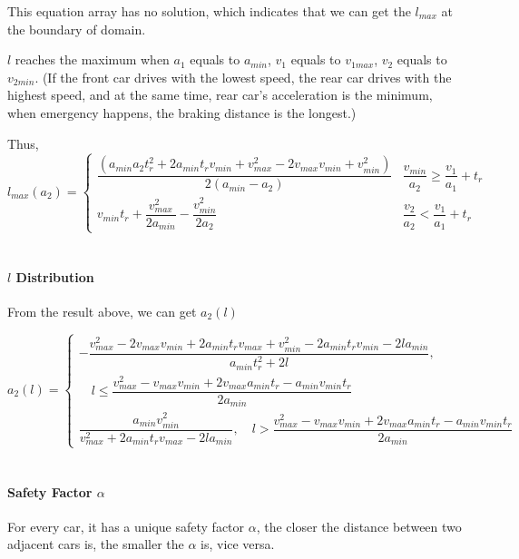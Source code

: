 This equation array has no solution, which indicates that we can 
get the $l_{max}$ at the boundary of domain.

$l$ reaches the maximum when $a_1$ equals to $a_{min}$, { }$v_1$ 
equals to $v_{1max}$, $v_2$ equals to $v_{2min}$. (If the front 
car drives with the lowest speed, the rear car drives with the 
highest speed, and at the same time, rear car's acceleration is 
the minimum, when emergency happens, the braking distance is 
the longest.)

Thus,
\begin{displaymath}
l_{max}(a_2) = 
\left \{
\begin{array}{cl}
\dfrac{(a_{min}a_2t_r^2 + 2a_{min}t_rv_{min} + v_{max}^2 - 2v_{max}v_{min} + v_{min}^2)}{2(a_{min}-a_2)} & \dfrac{v_{min}}{a_2}  \geq \dfrac{v_1}{a_1} + t_r \\
v_{min} t_r + \dfrac{v_{max} ^ 2}{2a_{min}} -\dfrac{v_{min}^2}{2a_2} & \dfrac{v_2}{a_2}  < \dfrac{v_1}{a_1} + t_r
\end{array}
\right .
\end{displaymath}\\

\paragraph{$l${ } Distribution}
From the result above, we can get $a_2(l)$

\[ a_2(l) = \begin{cases}
-\dfrac{v_{max}^2 - 2v_{max}v_{min} + 2a_{min}t_rv_{max} + v_{min}^2 - 2a_{min}t_rv_{min} - 2la_{min}}{a_{min}t_r^2 + 2l}, 
\\

\quad l \leq \dfrac{v_{max}^2 - v_{max}v_{min} + 2v_{max}a_{min}t_r - a_{min} v_{min}t_r}{2a_{min}}\\
\dfrac{a_{min}v_{min}^2}{v_{max}^2 + 2a_{min}t_rv_{max} - 2la_{min}}, \quad  l > \dfrac{v_{max}^2 - v_{max}v_{min} + 2v_{max}a_{min}t_r - a_{min} v_{min}t_r}{2a_{min}}
\end{cases}\]
\\

\paragraph{Safety Factor $\alpha$}
For every car, it has a unique safety factor $\alpha$, the 
closer the distance between two adjacent cars is, the smaller 
the $\alpha$ is, vice versa.\\

